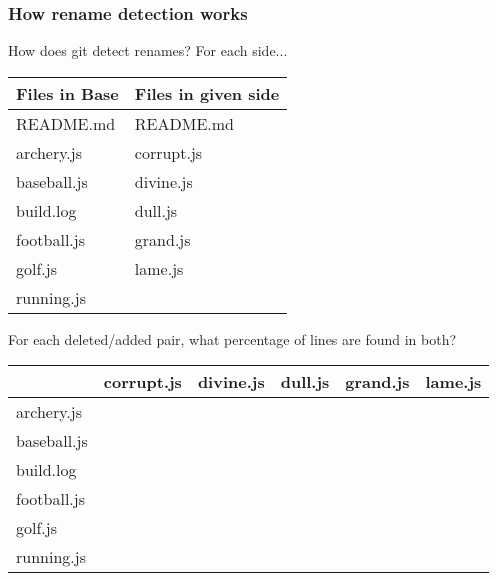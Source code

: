 \documentclass[compress,t]{beamer}
\begin{document}
\begin{frame}
  \frametitle{How rename detection works}

  How does git detect renames?  For each side...\\[0.25em]
  \pause
  \vspace*{-0.5\baselineskip}
  \begin{center}
    {\footnotesize
    \begin{tabular}{l|l}
      Files in Base  &  Files in given side \\
      \hline
      README.md      &  README.md   \\
      archery.js     &  corrupt.js  \\
      baseball.js    &  divine.js   \\
      build.log      &  dull.js     \\
      football.js    &  grand.js    \\
      golf.js        &  lame.js     \\
      running.js     &
    \end{tabular}
    }
  \end{center}
  \vspace*{-0.5\baselineskip}

  \pause
  \vspace*{\baselineskip}
  For each deleted/added pair, what percentage of lines are found in both?
  \pause
  \vspace*{-0.25\baselineskip}
  \begin{center}
    {\footnotesize
    \begin{tabular}{l|l|l|l|l|l}
                   & corrupt.js & divine.js & dull.js & grand.js & lame.js \\
      \hline
      archery.js   &&&&& \\
      baseball.js  &&&&& \\
      build.log    &&&&& \\
      football.js  &&&&& \\
      golf.js      &&&&& \\
      running.js   &&&&&
    \end{tabular}
    }
  \end{center}

\end{frame}
\end{document}
